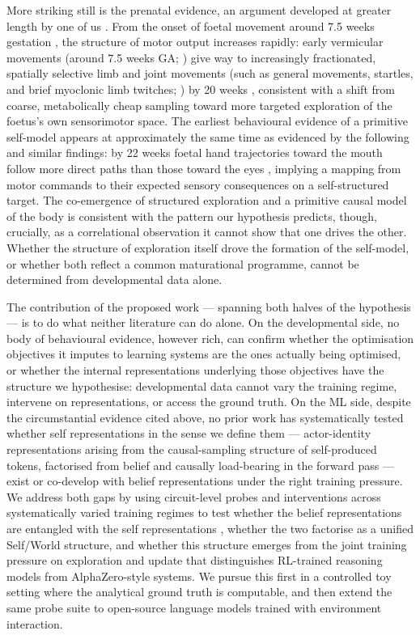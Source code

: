 \documentclass[11pt]{article}
\begin{document}
More striking still is the prenatal evidence, an argument developed at greater length by one of us \citep{rutar2026prenatal}. From the onset of foetal movement around 7.5 weeks gestation \citep{prechtl1985ultrasound}, the structure of motor output increases rapidly: early vermicular movements
(around 7.5 weeks GA; \citep{prechtl1985ultrasound}) give way to increasingly
fractionated, spatially selective limb and joint movements (such as general movements,
startles, and brief myoclonic limb twitches; \citep{devries1982emergence,
piontelli2010conclusions, tiriac2014selfgenerated, lindemann2016spindle}) by 20 weeks
\citep{devries1982emergence}, consistent with a shift from coarse, metabolically cheap sampling toward more targeted exploration of the foetus's own sensorimotor space. The earliest behavioural evidence of a primitive self-model appears at approximately the same time as evidenced by the following and similar findings: by 22 weeks foetal hand trajectories toward the mouth follow more direct paths than those toward the eyes \citep{zoia2007evidence}, implying a mapping from motor commands to their expected sensory consequences on a self-structured target. The co-emergence of structured exploration and a primitive causal model of the body is consistent with the pattern our hypothesis predicts, though, crucially, as a correlational observation it cannot show that one drives the other. Whether the structure of exploration itself drove the formation of the self-model, or whether both reflect a common maturational programme, cannot be determined from developmental data alone.

The contribution of the proposed work --- spanning both halves of the hypothesis --- is to do what neither literature can do alone. On the developmental side, no body of behavioural evidence, however rich, can confirm whether the optimisation objectives it imputes to learning systems are the ones actually being optimised, or whether the internal representations underlying those objectives have the structure we hypothesise: developmental data cannot vary the training regime, intervene on representations, or access the ground truth. On the ML side, despite the circumstantial evidence cited above, no prior work has systematically tested whether self representations in the sense we define them --- actor-identity representations arising from the causal-sampling structure of self-produced tokens, factorised from belief and causally load-bearing in the forward pass --- exist or co-develop with belief representations under the right training pressure. We address both gaps by using circuit-level probes and interventions across systematically varied training regimes to test whether the belief representations \citep{shai2024belief,hennig2023emergence} are entangled with the self representations \citep{betley2025tellme}, whether the two factorise as a unified Self/World structure, and whether this structure emerges from the joint training pressure on exploration and update that distinguishes RL-trained reasoning models from AlphaZero-style systems. We pursue this first in a controlled toy setting where the analytical ground truth is computable, and then extend the same probe suite to open-source language models trained with environment interaction. 
\end{document}
